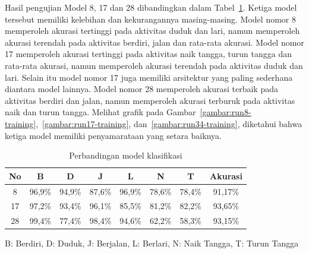 Hasil pengujian Model 8, 17 dan 28 dibandingkan dalam Tabel~\ref{table:perbandingan-model-klasifikasi}. Ketiga model tersebut memiliki kelebihan dan kekurangannya masing-masing. Model nomor 8 memperoleh akurasi tertinggi pada aktivitas duduk dan lari, namun memperoleh akurasi terendah pada aktivitas berdiri, jalan dan rata-rata akurasi. Model nomor 17 memperoleh akurasi tertinggi pada aktivitas naik tangga, turun tangga dan rata-rata akurasi, namun memperoleh akurasi terendah pada aktivitas duduk dan lari. Selain itu model nomor 17 juga memiliki arsitektur yang paling sederhana diantara model lainnya. Model nomor 28 memperoleh akurasi terbaik pada aktivitas berdiri dan jalan, namun memperoleh akurasi terburuk pada aktivitas naik dan turun tangga. Melihat grafik pada Gambar~\ref{gambar:run8-training},~\ref{gambar:run17-training}, dan~\ref{gambar:run34-training}, diketahui bahwa ketiga model memiliki penyamarataan yang setara baiknya.

\begin{table}[h!]
    \centering
    \caption{Perbandingan model klasifikasi}
    \begin{threeparttable}
        \begin{tabular}{ |c|c|c|c|c|c|c|c| }
            \hline
            No & B & D & J & L & N & T & Akurasi \\

            \hline
            8 & \cellcolor{red!10} 96,9\% & \cellcolor{teal!20}94,9\% & \cellcolor{red!10} 87,6\% & \cellcolor{teal!20} 96,9\% & 78,6\% & 78,4\% & \cellcolor{red!10} 91,17\% \\

            \hline
            17 & 97,2\% & \cellcolor{red!10} 93,4\% & 96,1\% & \cellcolor{red!10} 85,5\% & \cellcolor{teal!20} 81,2\% & \cellcolor{teal!20} 82,2\% & \cellcolor{teal!20} 93,65\% \\

            \hline
            28 & \cellcolor{teal!20} 99,4\% & 77,4\% & \cellcolor{teal!20} 98,4\% & 94,6\% & \cellcolor{red!10} 62,2\% & \cellcolor{red!10} 58,3\% & 93,15\% \\

            \hline
        \end{tabular}
        \begin{tablenotes}\footnotesize
            \item  B: Berdiri, D: Duduk, J: Berjalan, L: Berlari, N: Naik Tangga, T: Turun Tangga 
        \end{tablenotes}    
    \end{threeparttable}
    \label{table:perbandingan-model-klasifikasi}
\end{table}

